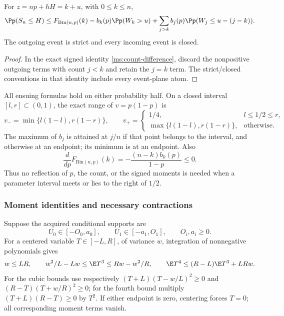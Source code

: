 \begin{lemma}
\label{ms:finite:countcore:countidentity}
For \(z=np+hH=k+u\), with \(0\le k\le n\),
\begin{equation}
 \Pp(S_n\le H)
 \le F_{\mathrm{Bin}(n,p)}(k)-b_k(p)\Pp(W_k>u)
       +\sum_{j>k}b_j(p)\Pp(W_j\le u-(j-k)).
 \label{ms:finite:countcore:countineq}
\end{equation}
The outgoing event is strict and every incoming event is closed.
\end{lemma}
\begin{proof}
In the exact signed identity \eqref{ms:count-difference}, discard the
nonpositive outgoing terms with count $j<k$ and retain the $j=k$ term.
The strict/closed conventions in that identity include every event-plane atom.
\end{proof}

All ensuing formulas hold on either probability half. On a closed interval
\([l,r]\subset(0,1)\), the exact range of \(v=p(1-p)\) is
\[
 v_- =\min\{l(1-l),r(1-r)\},\qquad
 v_+=\begin{cases}1/4,&l\le1/2\le r,\\
                  \max\{l(1-l),r(1-r)\},&\text{otherwise}.
       \end{cases}
\]
The maximum of \(b_j\) is attained at \(j/n\) if that point belongs
to the interval, and otherwise at an endpoint; its minimum is at an
endpoint. Also
\[
 \frac{d}{dp}F_{\mathrm{Bin}(n,p)}(k)
 =-\frac{(n-k)b_k(p)}{1-p}\le0.
\]
Thus no reflection of \(p\), the count, or the signed moments is needed
when a parameter interval meets or lies to the right of \(1/2\).

\subsubsection{Moment identities and necessary contractions}

Suppose the acquired conditional supports are
\begin{equation}
 U_0\in[-O_0,a_0],\qquad U_1\in[-a_1,O_1],
 \qquad O_i,a_i\ge0.
 \label{ms:finite:countcore:support}
\end{equation}
For a centered variable \(T\in[-L,R]\), of variance \(w\),
integration of nonnegative polynomials gives
\begin{equation}
 w\le LR,\qquad
 w^2/L-Lw\le\E T^3\le Rw-w^2/R,
 \qquad \E T^4\le(R-L)\E T^3+LRw.
 \label{ms:finite:countcore:momentbounds}
\end{equation}
For the cubic bounds use respectively
\((T+L)(T-w/L)^2\ge0\) and
\((R-T)(T+w/R)^2\ge0\); for the fourth bound multiply
\((T+L)(R-T)\ge0\) by \(T^2\). If either endpoint is zero,
centering forces \(T=0\); all corresponding moment terms vanish.

